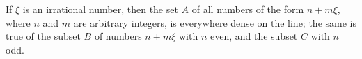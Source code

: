 If $\xi$ is an irrational number, then the set $A$ of all numbers of the form $n + m\xi$, where $n$ and $m$ are arbitrary integers, is everywhere dense on the line; the same is true of the subset $B$ of numbers $n + m\xi$ with $n$ even, and the subset $C$ with $n$ odd.
